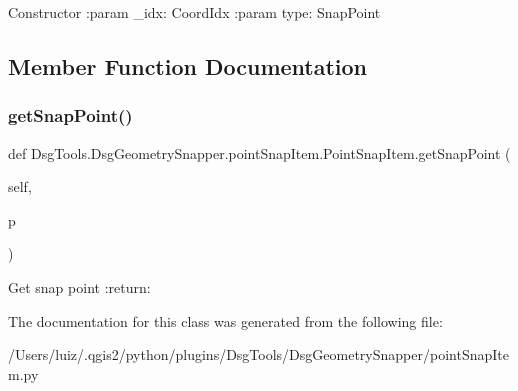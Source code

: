 \begin{DoxyVerb}Constructor
:param _idx: CoordIdx
:param type: SnapPoint
\end{DoxyVerb}
 

\subsection{Member Function Documentation}
\mbox{\label{class_dsg_tools_1_1_dsg_geometry_snapper_1_1point_snap_item_1_1_point_snap_item_a1c877e5932e883d3349cc092090ed84c}} 
\subsubsection{\texorpdfstring{get\+Snap\+Point()}{getSnapPoint()}}
{\footnotesize\ttfamily def Dsg\+Tools.\+Dsg\+Geometry\+Snapper.\+point\+Snap\+Item.\+Point\+Snap\+Item.\+get\+Snap\+Point (\begin{DoxyParamCaption}\item[{}]{self,  }\item[{}]{p }\end{DoxyParamCaption})}

\begin{DoxyVerb}Get snap point
:return:
\end{DoxyVerb}
 

The documentation for this class was generated from the following file\+:\begin{DoxyCompactItemize}
\item 
/\+Users/luiz/.\+qgis2/python/plugins/\+Dsg\+Tools/\+Dsg\+Geometry\+Snapper/point\+Snap\+Item.\+py\end{DoxyCompactItemize}
